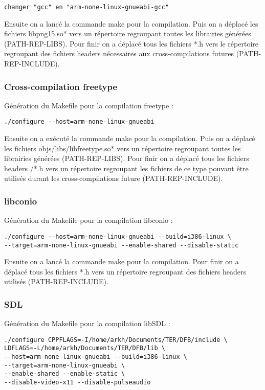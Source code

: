 \begin{lstlisting}
changer "gcc" en "arm-none-linux-gnueabi-gcc"
\end{lstlisting}

Ensuite on a lancé la commande make pour la compilation.
Puis on a  déplacé les fichiers libpng15.so* vers un répertoire regroupant toutes les librairies générées (PATH-REP-LIBS). 
Pour finir on a déplacé tous les fichiers *.h vers le répertoire regroupant des fichiers headers nécessaires aux cross-compilations futures (PATH-REP-INCLUDE).

\subsubsection{Cross-compilation freetype}
Génération du Makefile pour la compilation freetype :

\begin{lstlisting}
./configure --host=arm-none-linux-gnueabi
\end{lstlisting}

Ensuite on a exécuté la commande make pour la compilation.
Puis on a déplacé les fichiers objs/libs/libfreetype.so* vers un répertoire regroupant toutes les librairies générées (PATH-REP-LIBS).
Pour finir on a déplacé tous les fichiers headers /*.h vers un répertoire regroupant les fichiers de ce type pouvant être utilisés durant les cross-compilations future (PATH-REP-INCLUDE).

\subsubsection{libconio}
Génération du Makefile pour la compilation libconio :

\begin{lstlisting}
./configure --host=arm-none-linux-gnueabi --build=i386-linux \
--target=arm-none-linux-gnueabi --enable-shared --disable-static
\end{lstlisting}
Ensuite on a lancé la commande make pour la compilation.
Pour finir on a déplacé tous les fichiers *.h vers un répertoire regroupant des fichiers headers utilisés (PATH-REP-INCLUDE).

\subsubsection{SDL}
Génération du Makefile pour la compilation libSDL :

\begin{lstlisting}
./configure CPPFLAGS=-I/home/arkh/Documents/TER/DFB/include \ 
LDFLAGS=-L/home/arkh/Documents/TER/DFB/lib \
--host=arm-none-linux-gnueabi --build=i386-linux \ 
--target=arm-none-linux-gnueabi \
--enable-shared --enable-static \
--disable-video-x11 --disable-pulseaudio
\end{lstlisting}

